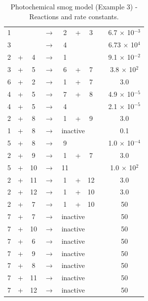 \documentclass[letterpaper,12pt,onehalfspacing,twoside]{article}
\theoremstyle{msds}
\begin{document}
\begin{table}[H]
\centering
\caption{Photochemical smog model (Example 3) - Reactions and rate constants.}
\label{tab:smog}
\begin{tabular}{@{}ccccccccc@{}}
\toprule
1 &   &    & $\longrightarrow$ & 2        & +       & 3       &  & 6.7 $\times$ 10$^{-\text{3}}$   \\
3 &   &    & $\longrightarrow$ & 4        &         &         &  & 6.73 $\times$ 10$^{\text{4}} $  \\
2 & + & 4  & $\longrightarrow$ & 1        &         &         &  & 9.1  $\times$ 10$^{-\text{2}}$  \\
3 & + & 5  & $\longrightarrow$ & 6        & +       & 7       &  & 3.8 $\times$ 10$^{\text{2}}  $   \\
6 & + & 2  & $\longrightarrow$ & 1        & +       & 7       &  & 3.0       \\
4 & + & 5  & $\longrightarrow$ & 7        & +       & 8       &  & 4.9 $\times$ 10$^{-\text{5}}$\\
4 & + & 5  & $\longrightarrow$ & 4        &         &         &  & 2.1 $\times$ 10$^{-\text{5}}$\\
2 & + & 8  & $\longrightarrow$ & 1        &    +    & 9       &  & 3.0        \\
1 & + & 8  & $\longrightarrow$ & \multicolumn{3}{l}{inactive} &  & 0.1      \\
5 & + & 8  & $\longrightarrow$ & 9        &         &         &  & 1.0 $\times$ 10$^{-\text{4}}  $\\
2 & + & 9  & $\longrightarrow$ & 1        & +       & 7       &  & 3.0        \\
5 & + & 10 & $\longrightarrow$ & 11       &         &         &  & 1.0 $\times$ 10$^{\text{2}}   $   \\
2 & + & 11 & $\longrightarrow$ & 1        & +       & 12      &  & 3.0       \\
2 & + & 12 & $\longrightarrow$ & 1        & +       & 10      &  & 3.0     \\
2 & + & 7  & $\longrightarrow$ & 1        & +       & 10      &  & 50       \\
7 & + & 7  & $\longrightarrow$ & \multicolumn{3}{l}{inactive} &  & 50       \\
7 & + & 10 & $\longrightarrow$ & \multicolumn{3}{l}{inactive} &  & 50       \\
7 & + & 6  & $\longrightarrow$ & \multicolumn{3}{l}{inactive} &  & 50       \\
7 & + & 9  & $\longrightarrow$ & \multicolumn{3}{l}{inactive} &  & 50       \\
7 & + & 8  & $\longrightarrow$ & \multicolumn{3}{l}{inactive} &  & 50       \\
7 & + & 11 & $\longrightarrow$ & \multicolumn{3}{l}{inactive} &  & 50       \\
7 & + & 12 & $\longrightarrow$ & \multicolumn{3}{l}{inactive} &  & 50       \\ \bottomrule
\end{tabular}
\end{table}
\end{document}
